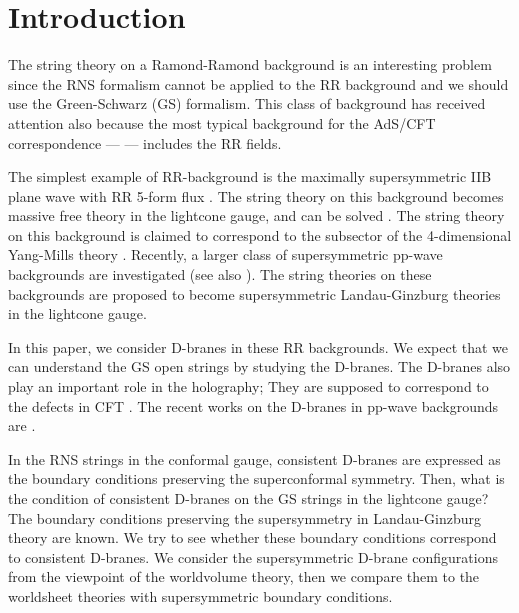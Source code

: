 \documentclass[a4paper,12pt]{article}
\numberwithin{equation}{section}
\providecommand{\Ncal}{{\cal N}}
\begin{document}
\newpage
\setcounter{page}{1}


\section{Introduction}

The string theory on a Ramond-Ramond background is an interesting problem
since the RNS formalism cannot be applied to the RR background and
we should use the Green-Schwarz (GS) formalism. 
This class of background has received attention
also because the most typical background for the AdS/CFT 
correspondence --- \coordHE{} --- includes the RR fields.

The simplest example of RR-background is the maximally supersymmetric
IIB plane wave with RR 5-form flux \cite{Blau:2001ne,Blau:2002dy,Blau:2002mw}. 
The string theory on this background becomes massive free theory
in the lightcone gauge, and can be solved \cite{Metsaev:2001bj,Metsaev:2002re}.
The string theory on this background is claimed to correspond to the
subsector of
the 4-dimensional \myHighlight{$\Ncal=4$}\coordHE{}
Yang-Mills theory \cite{Berenstein:2002jq}.
Recently, a larger class of supersymmetric pp-wave backgrounds are
investigated \cite{Maldacena:2002fy} (see also
 \cite{Berkovits:2002vn,Russo:2002qj,Bonelli:2002fs,Berkovits:2002rd}).
The string theories
on these backgrounds are proposed to become supersymmetric Landau-Ginzburg
theories in the lightcone gauge.

In this paper, we consider D-branes in these RR backgrounds. 
We expect that we can understand the GS open strings by studying the
D-branes. The D-branes also play an important role in the holography; 
They are supposed to correspond to the defects in CFT
\cite{Karch:2000gx,DeWolfe:2001pq,Bachas:2001vj,Erdmenger:2002ex,Mateos:2002bu,Yamaguchi:2002pa}. 
The recent works on the D-branes in pp-wave backgrounds are
\cite{Billo:2002ff,Dabholkar:2002zc,Berenstein:2002zw,%
   Chu:2002in,Lee:2002cu,Kumar:2002ps,%
   Skenderis:2002vf,Balasubramanian:2002sa,Takayanagi:2002je,%
   Bain:2002nq,Alishahiha:2002rw,Bergman:2002hv,Seki:2002wz,Mateos:2002an,%
   Pal:2002vx,Naculich:2002fh,Michishita:2002jp,Bain:2002tq,Alishahiha:2002nf,%
   Biswas:2002yz,Takayanagi:2002nv,Nayak:2002ty}.

In the RNS strings in the conformal gauge, consistent D-branes
are expressed as the boundary conditions
preserving the superconformal symmetry. 
Then, what is the condition of consistent D-branes 
on the GS strings in the lightcone gauge?
The boundary conditions preserving the supersymmetry in Landau-Ginzburg theory
are known\cite{Hori:2000ck}. We try to see whether these boundary
conditions correspond to consistent D-branes.
We consider the supersymmetric D-brane configurations from the viewpoint
of the worldvolume theory, 
then we compare them to the worldsheet theories with supersymmetric
boundary conditions.
\end{document}
